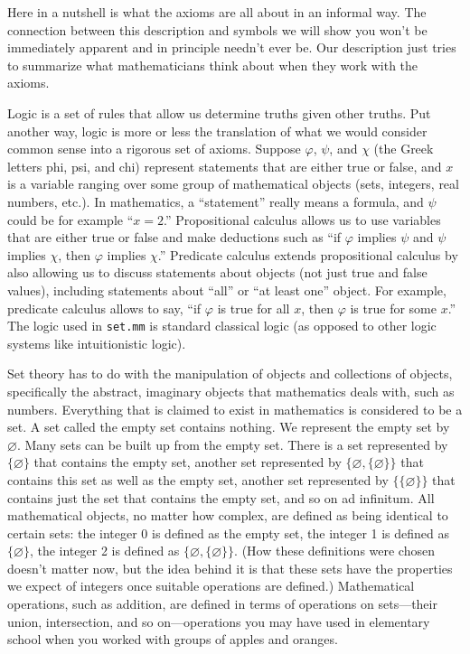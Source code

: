 Here in a nutshell is what the axioms are all about in an informal way. The
connection between this description and symbols we will show you won't be
immediately apparent and in principle needn't ever be.  Our description just
tries to summarize what mathematicians think about when they work with the
axioms.

Logic is a set of rules that allow us determine truths given other truths.
Put another way,
logic is more or less the translation of what we would consider common sense
into a rigorous set of axioms.  Suppose $\varphi$,
$\psi$, and $\chi$ (the Greek letters phi, psi, and chi) represent statements
that are either true or false, and $x$ is a variable ranging over some group of mathematical objects (sets, integers,
real numbers, etc.). In mathematics, a ``statement'' really means a formula,
and $\psi$ could be for example ``$x = 2$.''
Propositional calculus
allows us to use variables that are either true or false
and make deductions such as
``if $\varphi$ implies $\psi$ and $\psi$ implies $\chi$, then $\varphi$
implies $\chi$.''
Predicate calculus
extends propositional calculus by also allowing us
to discuss statements about objects (not just true and false values), including
statements about ``all'' or ``at least one'' object.
For example, predicate calculus allows to say,
``if $\varphi$ is true for all $x$, then $\varphi$ is true for some $x$.''
The logic used in \texttt{set.mm} is standard classical logic
(as opposed to other logic systems like intuitionistic logic).

Set theory has to do with the manipulation of objects and
collections of objects, specifically the abstract, imaginary objects that
mathematics deals with, such as numbers. Everything that is claimed to exist
in mathematics is considered to be a set.  A set called the empty
set contains nothing.  We represent the empty set by
$\varnothing$.  Many sets can be built up from the empty set.  There is a set
represented by $\{\varnothing\}$ that contains the empty set, another set
represented by $\{\varnothing,\{\varnothing\}\}$ that contains this set as
well as the empty set, another set represented by $\{\{\varnothing\}\}$ that
contains just the set that contains the empty set, and so on ad infinitum. All
mathematical objects, no matter how complex, are defined as being identical to
certain sets: the integer 0 is defined as the empty set, the
integer 1 is defined as $\{\varnothing\}$, the integer 2 is defined as
$\{\varnothing,\{\varnothing\}\}$.  (How these definitions were chosen doesn't
matter now, but the idea behind it is that these sets have the properties we
expect of integers once suitable operations are defined.)  Mathematical
operations, such as addition, are defined in terms of operations on
sets---their union, intersection, and
so on---operations you may have used in elementary school when you worked
with groups of apples and oranges.

